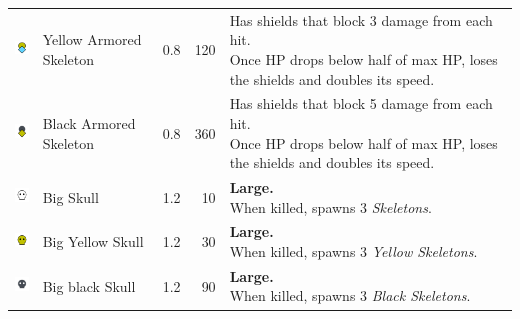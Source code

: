 \begin{table}[H]
\begin{tabular}{m{9mm}m{25mm}D{.}{.}{-1}rm{0.48\textwidth}}
        \includegraphics[height=7mm]{img/Icons/Attackers/Armored Yellow Skeleton.png} & \footnotesize{Yellow Armored Skeleton} & 0.8                 & 120              & \footnotesize{Has shields that block 3 damage from each hit. \newline Once HP drops below half of max HP, loses the shields and doubles its speed.} \\
        \includegraphics[height=7mm]{img/Icons/Attackers/Armored Black Skeleton.png}  & \footnotesize{Black Armored Skeleton}  & 0.8                 & 360              & \footnotesize{Has shields that block 5 damage from each hit. \newline Once HP drops below half of max HP, loses the shields and doubles its speed.} \\
        \includegraphics[height=7mm]{img/Icons/Attackers/Big Skull.png}               & \footnotesize{Big Skull}               & 1.2                 & 10               & \footnotesize{\textbf{Large.} \newline When killed, spawns 3 \emph{Skeletons}.}                                                                     \\
        \includegraphics[height=7mm]{img/Icons/Attackers/Big Yellow Skull.png}        & \footnotesize{Big Yellow Skull}        & 1.2                 & 30               & \footnotesize{\textbf{Large.} \newline When killed, spawns 3 \emph{Yellow Skeletons}.}                                                              \\
        \includegraphics[height=7mm]{img/Icons/Attackers/Big Black Skull.png}         & \footnotesize{Big black Skull}         & 1.2                 & 90               & \footnotesize{\textbf{Large.} \newline When killed, spawns 3 \emph{Black Skeletons}.}                                                               \\

\end{tabular}
\end{table}
